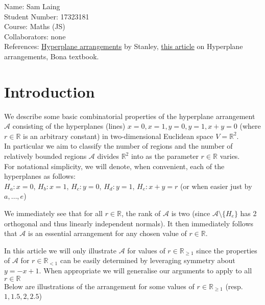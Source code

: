 \documentclass[12pt]{article}
\newcommand{\R}{\mathbb{R}}
\newenvironment{remark}[1][Remark]{\begin{trivlist}
\item[\hskip \labelsep {\bfseries #1}]}{\end{trivlist}}
\begin{document}
\begin{center}
\Huge{}
\end{center}
Name: Sam Laing\\
Student Number: 17323181\\
Course: Maths (JS)\\
Collaborators: none\\
References: \href{https://www.cis.upenn.edu/~cis610/sp06stanley.pdf}{Hyperplane arrangements} by Stanley, \href{https://www.ams.org/journals/bull/1999-36-02/S0273-0979-99-00775-2/S0273-0979-99-00775-2.pdf}{this article} on Hyperplane arrangements, Bona textbook.
\tableofcontents
\newpage
\section{Introduction}
We describe some basic combinatorial properties of the hyperplane arrangement $\mathcal{A}$ consisting of the hyperplanes (lines) $x=0,x=1,y=0,y=1,x+y=0$ (where $r\in \R$ is an arbitrary constant) in two-dimensional Euclidean space $V = \R^2$.\\
In particular we aim to classify the number of regions and the number of relatively bounded regions $\mathcal{A}$ divides $\R^2$ into as the parameter $r\in \R$ varies.\\
For notational simplicity, we will denote, when convenient, each of the hyperplanes as follows: \\
$H_a: x=0$, $H_b: x=1$, $H_c: y=0$, $H_d: y=1$, $H_e: x+y=r$ (or when easier just by $a,\ldots,e$)
\begin{remark}
We immediately see that for all $r\in \R$, the rank of $\mathcal{A}$ is two (since $\mathcal{A}\setminus \{H_e\} $ has 2 orthogonal and thus linearly independent normals). It then immediately follows that $\mathcal{A}$ is an essential arrangement for any chosen value of $r\in \R$.
\end{remark}
In this article we will only illustrate $\mathcal{A}$ for values of $r\in \R_{\ge 1}$ since the properties of $\mathcal{A}$ for $r\in \R_{<1}$ can be easily determined by leveraging symmetry about $y=-x+1$. When appropriate we will generalise our arguments to apply to all $r\in \R$\\
Below are illustrations of the arrangement for some values of $r\in \R_{\ge 1}$ (resp. $1,1.5,2,2.5$)
\end{document}
